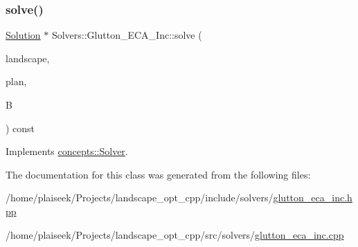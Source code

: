 \subsubsection{\texorpdfstring{solve()}{solve()}}
{\footnotesize\ttfamily \hyperlink{class_solution}{Solution} $\ast$ Solvers\+::\+Glutton\+\_\+\+E\+C\+A\+\_\+\+Inc\+::solve (\begin{DoxyParamCaption}\item[{const \hyperlink{class_landscape}{Landscape} \&}]{landscape,  }\item[{const \hyperlink{class_restoration_plan}{Restoration\+Plan} \&}]{plan,  }\item[{const double}]{B }\end{DoxyParamCaption}) const\hspace{0.3cm}{\ttfamily [virtual]}}



Implements \hyperlink{classconcepts_1_1_solver_af323ad29df1e7b87facd7dc007568c80}{concepts\+::\+Solver}.



The documentation for this class was generated from the following files\+:\begin{DoxyCompactItemize}
\item 
/home/plaiseek/\+Projects/landscape\+\_\+opt\+\_\+cpp/include/solvers/\hyperlink{glutton__eca__inc_8hpp}{glutton\+\_\+eca\+\_\+inc.\+hpp}\item 
/home/plaiseek/\+Projects/landscape\+\_\+opt\+\_\+cpp/src/solvers/\hyperlink{glutton__eca__inc_8cpp}{glutton\+\_\+eca\+\_\+inc.\+cpp}\end{DoxyCompactItemize}
